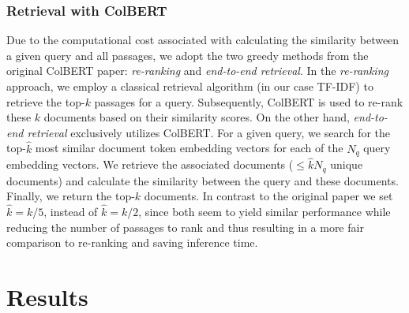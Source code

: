 \documentclass[11pt]{article}
\begin{document}
\subsubsection{Retrieval with ColBERT}
Due to the computational cost associated with calculating the similarity between a given query and all passages, we adopt the two greedy methods from the original ColBERT paper: \textit{re-ranking} and \textit{end-to-end retrieval}. In the \textit{re-ranking} approach, we employ a classical retrieval algorithm (in our case TF-IDF) to retrieve the top-$k$ passages for a query. Subsequently, ColBERT is used to re-rank these $k$ documents based on their similarity scores. On the other hand, \textit{end-to-end retrieval} exclusively utilizes ColBERT. For a given query, we search for the top-$\hat{k}$ most similar document token embedding vectors for each of the $N_q$ query embedding vectors. We retrieve the associated documents ($\leq \hat{k}N_q$ unique documents) and calculate the similarity between the query and these documents. Finally, we return the top-$k$ documents. In contrast to the original paper we set $\hat{k} = k / 5$, instead of $\hat{k} = k / 2$, since both seem to yield similar performance while reducing the number of passages to rank and thus resulting in a more fair comparison to re-ranking and saving inference time.

\section{Results}
\end{document}
